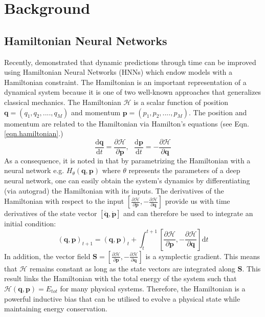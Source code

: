 \documentclass[twoside]{article}
\begin{document}
\section{Background}

\subsection{Hamiltonian Neural Networks}

Recently, \cite{greydanus_hamiltonian_2019} demonstrated that dynamic predictions through time can be improved using Hamiltonian Neural Networks (HNNs) which endow models with a Hamiltonian constraint. The Hamiltonian is an important representation of a dynamical system because it is one of two well-known approaches that generalizes classical mechanics. The Hamiltonian $\mathcal{H}$ is a scalar function of position $\mathbf{q} = (q_1,q_2,....,q_M)$ and momentum $\mathbf{p} = (p_1,p_2,....,p_M)$. The position and momentum are related to the Hamiltonian via Hamilton's equations (see Eqn.\ref{eqn.hamiltonian}.)
\begin{equation}
\frac{\mathrm{d}\mathbf{q}}{\mathrm{d}t} = \frac{\partial \mathcal{H}}{\partial \mathbf{p}}, ~~~
\frac{\mathrm{d}\mathbf{p}}{\mathrm{d}t} = -\frac{\partial \mathcal{H}}{\partial \mathbf{q}}
\label{eqn.hamiltonian}
\end{equation}
As a consequence, it is noted in \cite{greydanus_hamiltonian_2019} that by parametrizing the Hamiltonian with a neural network e.g. $H_{\theta}(\mathbf{q},\mathbf{p})$ where $\theta$ represents the parameters of a deep neural network, one can easily obtain the system's dynamics by differentiating (via autograd) the Hamiltonian with its inputs. The derivatives of the Hamiltonian with respect to the input $\left [ \frac{\partial \mathcal{H}}{\partial \mathbf{p}},-\frac{\partial \mathcal{H}}{\partial \mathbf{q}} \right ]$ provide us with time derivatives of the state vector $[\dot{\mathbf{q}},\dot{\mathbf{p}}]$ and can therefore be used to integrate an initial condition:
\begin{equation}
(\mathbf{q},\mathbf{p})_{t+1} = (\mathbf{q},\mathbf{p})_t + \int_t^{t+1} \left [ \frac{\partial \mathcal{H}}{\partial \mathbf{p}},-\frac{\partial \mathcal{H}}{\partial \mathbf{q}} \right ] \mathrm{d}t
\label{eqn.action_int}
\end{equation}
In addition, the vector field $\mathbf{S} = \left [ \frac{\partial \mathcal{H}}{\partial \mathbf{p}},-\frac{\partial \mathcal{H}}{\partial \mathbf{q}} \right ]$ is a symplectic gradient. This means that $\mathcal{H}$ remains constant as long as the state vectors are integrated along $\mathbf{S}$. This result links the Hamiltonian with the total energy of the system such that $\mathcal{H}(\mathbf{q},\mathbf{p}) = E_{tot}$ for many physical systems. Therefore, the Hamiltonian is a powerful inductive bias that can be utilised to evolve a physical state while maintaining energy conservation. 
\end{document}
